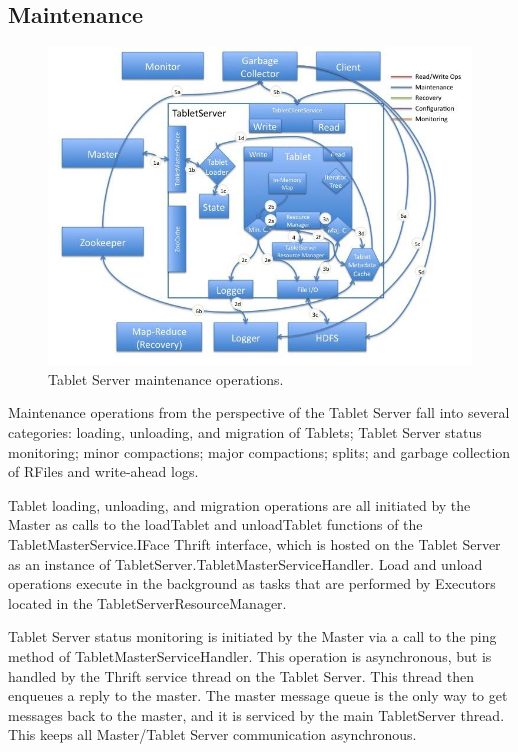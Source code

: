 \documentclass[letterpaper,onecolumn,12pt,titlepage]{article}
\begin{document}
\subsection{Maintenance}
\begin{figure}[htbp]
\center
\includegraphics[scale=.6]{images/tserver_maintenance.jpg}
\caption{\label{fig_ts_maintenance} Tablet Server maintenance operations.}
\end{figure}

Maintenance operations from the perspective of the Tablet Server fall into several categories: loading, unloading, and migration of Tablets; Tablet Server status monitoring; minor compactions; major compactions; splits; and garbage collection of RFiles and write-ahead logs.

Tablet loading, unloading, and migration operations are all initiated by the Master as calls to the loadTablet and unloadTablet functions of the TabletMasterService.IFace Thrift interface, which is hosted on the Tablet Server as an instance of TabletServer.TabletMasterServiceHandler.
Load and unload operations execute in the background as tasks that are performed by Executors located in the TabletServerResourceManager.

Tablet Server status monitoring is initiated by the Master via a call to the ping method of TabletMasterServiceHandler.
This operation is asynchronous, but is handled by the Thrift service thread on the Tablet Server.
This thread then enqueues a reply to the master.
The master message queue is the only way to get messages back to the master, and it is serviced by the main TabletServer thread.
This keeps all Master/Tablet Server communication asynchronous.
\end{document}
